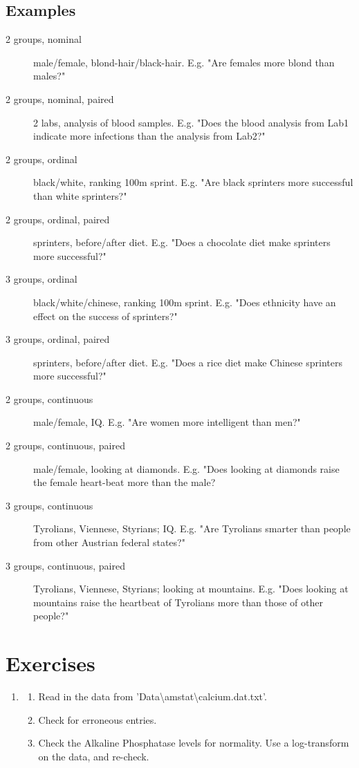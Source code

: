 \subsection{Examples}

\begin{description}
  \item[2 groups, nominal] male/female, blond-hair/black-hair. E.g. "Are females more blond than males?"
  \item[2 groups, nominal, paired] 2 labs, analysis of blood samples. E.g. "Does the blood analysis from Lab1 indicate more infections than the analysis from Lab2?"
  \item[2 groups, ordinal] black/white, ranking 100m sprint. E.g. "Are black sprinters more successful than white sprinters?"
  \item[2 groups, ordinal, paired] sprinters, before/after diet. E.g. "Does a chocolate diet make sprinters more successful?"
  \item[3 groups, ordinal] black/white/chinese, ranking 100m sprint. E.g. "Does ethnicity have an effect on the success of sprinters?"
  \item[3 groups, ordinal, paired] sprinters, before/after diet. E.g. "Does a rice diet make Chinese sprinters more successful?"
  \item[2 groups, continuous] male/female, IQ. E.g. "Are women more intelligent than men?"
  \item[2 groups, continuous, paired] male/female, looking at diamonds. E.g. "Does looking at diamonds raise the female heart-beat more than the male?
  \item[3 groups, continuous] Tyrolians, Viennese, Styrians; IQ. E.g. "Are Tyrolians smarter than people from other Austrian federal states?"
  \item[3 groups, continuous, paired] Tyrolians, Viennese, Styrians; looking at mountains. E.g. "Does looking at mountains raise the heartbeat of Tyrolians more than those of other people?"
\end{description}

\section{Exercises}
\begin{enumerate}
  \item
  \begin{enumerate}
    \item Read in the data from 'Data\textbackslash amstat\textbackslash calcium.dat.txt'.
    \item Check for erroneous entries.
    \item Check the Alkaline Phosphatase levels for normality. Use a log-transform on the data, and re-check.
  \end{enumerate}

\end{enumerate}

